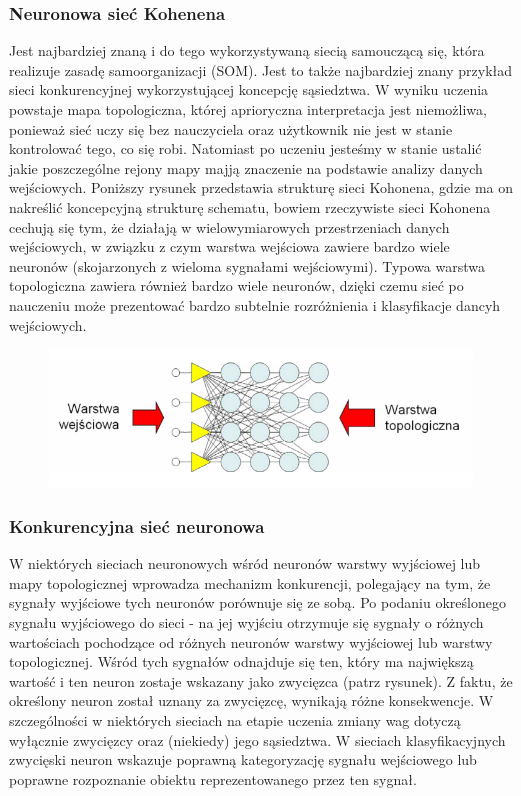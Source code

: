 \documentclass[11pt]{article}
\begin{document}
    \hypertarget{neuronowa-sieux107-kohenena}{%
\subsubsection{Neuronowa sieć
Kohenena}\label{neuronowa-sieux107-kohenena}}

Jest najbardziej znaną i do tego wykorzystywaną siecią samouczącą się,
która realizuje zasadę samoorganizacji (SOM). Jest to także najbardziej
znany przykład sieci konkurencyjnej wykorzystującej koncepcję
sąsiedztwa. W wyniku uczenia powstaje mapa topologiczna, której
aprioryczna interpretacja jest niemożliwa, ponieważ sieć uczy się bez
nauczyciela oraz użytkownik nie jest w stanie kontrolować tego, co się
robi. Natomiast po uczeniu jesteśmy w stanie ustalić jakie poszczególne
rejony mapy majją znaczenie na podstawie analizy danych wejściowych.
Poniższy rysunek przedstawia strukturę sieci Kohonena, gdzie ma on
nakreślić koncepcyjną strukturę schematu, bowiem rzeczywiste sieci
Kohonena cechują się tym, że działają w wielowymiarowych przestrzeniach
danych wejściowych, w związku z czym warstwa wejściowa zawiere bardzo
wiele neuronów (skojarzonych z wieloma sygnałami wejściowymi). Typowa
warstwa topologiczna zawiera również bardzo wiele neuronów, dzięki czemu
sieć po nauczeniu może prezentować bardzo subtelnie rozróżnienia i
klasyfikacje dancyh wejściowych.

\begin{figure}[h]
  \includegraphics{screeny/Kohonen_network_schema.png}
\end{figure}

\hypertarget{konkurencyjna-sieux107-neuronowa}{%
\subsubsection{Konkurencyjna sieć
neuronowa}\label{konkurencyjna-sieux107-neuronowa}}

W niektórych sieciach neuronowych wśród neuronów warstwy wyjściowej lub
mapy topologicznej wprowadza mechanizm konkurencji, polegający na tym,
że sygnały wyjściowe tych neuronów porównuje się ze sobą. Po podaniu
określonego sygnału wyjściowego do sieci - na jej wyjściu otrzymuje się
sygnały o różnych wartościach pochodzące od różnych neuronów warstwy
wyjściowej lub warstwy topologicznej. Wśród tych sygnałów odnajduje się
ten, który ma największą wartość i ten neuron zostaje wskazany jako
zwycięzca (patrz rysunek). Z faktu, że określony neuron został uznany za
zwycięzcę, wynikają różne konsekwencje. W szczególności w niektórych
sieciach na etapie uczenia zmiany wag dotyczą wyłącznie zwycięzcy oraz
(niekiedy) jego sąsiedztwa. W sieciach klasyfikacyjnych zwycięski neuron
wskazuje poprawną kategoryzację sygnału wejściowego lub poprawne
rozpoznanie obiektu reprezentowanego przez ten sygnał.
\end{document}
